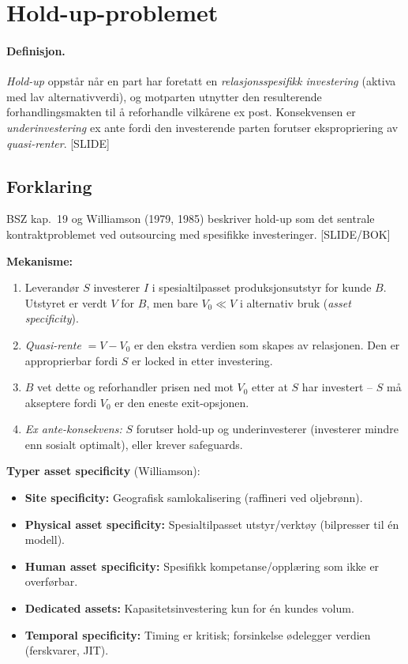 \section{Hold-up-problemet}\label{thr:hold-up-problem}

\paragraph{Definisjon.} \emph{Hold-up} oppstår når en part har foretatt en \emph{relasjonsspesifikk investering} (aktiva med lav alternativverdi), og motparten utnytter den resulterende forhandlingsmakten til å reforhandle vilkårene ex post. Konsekvensen er \emph{underinvestering} ex ante fordi den investerende parten forutser ekspropriering av \emph{quasi-renter}. [SLIDE]

\subsection*{Forklaring}

BSZ kap.\ 19 og Williamson (1979, 1985) beskriver hold-up som det sentrale kontraktproblemet ved outsourcing med spesifikke investeringer. [SLIDE/BOK]

\textbf{Mekanisme:}
\begin{enumerate}\setlength{\itemsep}{2pt}
\item Leverandør $S$ investerer $I$ i spesialtilpasset produksjonsutstyr for kunde $B$. Utstyret er verdt $V$ for $B$, men bare $V_0 \ll V$ i alternativ bruk (\emph{asset specificity}).
\item \emph{Quasi-rente} $= V - V_0$ er den ekstra verdien som skapes av relasjonen. Den er approprierbar fordi $S$ er locked in etter investering.
\item $B$ vet dette og reforhandler prisen ned mot $V_0$ etter at $S$ har investert -- $S$ må akseptere fordi $V_0$ er den eneste exit-opsjonen.
\item \emph{Ex ante-konsekvens:} $S$ forutser hold-up og underinvesterer (investerer mindre enn sosialt optimalt), eller krever safeguards.
\end{enumerate}

\textbf{Typer asset specificity} (Williamson):
\begin{itemize}\setlength{\itemsep}{1pt}
\item \textbf{Site specificity:} Geografisk samlokalisering (raffineri ved oljebrønn).
\item \textbf{Physical asset specificity:} Spesialtilpasset utstyr/verktøy (bilpresser til én modell).
\item \textbf{Human asset specificity:} Spesifikk kompetanse/opplæring som ikke er overførbar.
\item \textbf{Dedicated assets:} Kapasitetsinvestering kun for én kundes volum.
\item \textbf{Temporal specificity:} Timing er kritisk; forsinkelse ødelegger verdien (ferskvarer, JIT).
\end{itemize}

